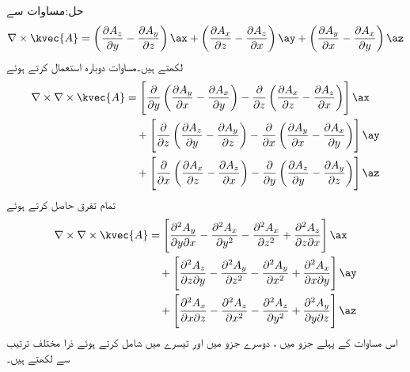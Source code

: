 حل:مساوات  سے 
\begin{align}
\nabla \times \kvec{A}=\left(\frac{\partial A_z}{\partial y}-\frac{\partial A_y}{\partial z} \right)\ax+\left( \frac{\partial A_x}{\partial z}-\frac{\partial A_z}{\partial x}\right)\ay+\left(\frac{\partial A_y}{\partial x}-\frac{\partial A_x}{\partial y} \right)\az
\end{align}
لکھتے  ہیں۔مساوات  دوبارہ استعمال کرتے ہوئے 
\begin{align*}
\nabla \times \nabla \times \kvec{A}&=\left[\frac{\partial}{\partial y}\left(\frac{\partial A_y}{\partial x}-\frac{\partial A_x}{\partial y} \right)-\frac{\partial}{\partial z}\left( \frac{\partial A_x}{\partial z}-\frac{\partial A_z}{\partial x}\right) \right]\ax\\
& \quad +\left[ \frac{\partial }{\partial z}\left(\frac{\partial A_z}{\partial y}-\frac{\partial A_y}{\partial z} \right)-\frac{\partial }{\partial x}\left(\frac{\partial A_y}{\partial x}-\frac{\partial A_x}{\partial y} \right)\right]\ay\\
&\quad +\left[\frac{\partial }{\partial x}\left( \frac{\partial A_x}{\partial z}-\frac{\partial A_z}{\partial x}\right)-\frac{\partial }{\partial y} \left(\frac{\partial A_z}{\partial y}-\frac{\partial A_y}{\partial z} \right)\right]\az
\end{align*}
تمام تفرق حاصل کرتے ہوئے
\begin{align*}
\nabla \times \nabla \times \kvec{A}&=\left[\frac{\partial^2 A_y}{\partial y\partial x}-\frac{\partial^2 A_x}{\partial y^2} -\frac{\partial^2 A_x}{\partial z^2}+\frac{\partial^2 A_z}{\partial z\partial x} \right]\ax\\
& \quad +\left[ \frac{\partial^2 A_z}{\partial z\partial y}-\frac{\partial^2 A_y}{\partial z^2}-\frac{\partial^2 A_y}{\partial x^2}+\frac{\partial^2 A_x}{\partial x\partial y} \right]\ay\\
&\quad +\left[ \frac{\partial^2 A_x}{\partial x\partial z}-\frac{\partial^2 A_z}{\partial x^2}- \frac{\partial^2 A_z}{\partial y^2}+\frac{\partial^2 A_y}{\partial y\partial z} \right]\az
\end{align*}
اس مساوات کے پہلے جزو میں ، دوسرے جزو میں  اور تیسرے میں  شامل کرتے ہوئے ذرا مختلف ترتیب سے لکھتے ہیں۔

